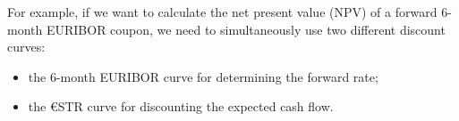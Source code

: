 For example, if we want to calculate the net present value (NPV) of a forward 6-month EURIBOR coupon, we need to simultaneously use two different discount curves: 

\begin{itemize}
\tightlist
\item the 6-month EURIBOR curve for determining the forward rate;
\item the \euro STR curve for discounting the expected cash flow.
\end{itemize}


